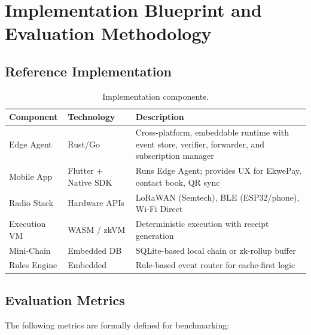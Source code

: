 \documentclass[11pt,a4paper]{article}
\begin{document}
\section{Implementation Blueprint and Evaluation Methodology}

\subsection{Reference Implementation}

\begin{table}[H]
\centering
\caption{Implementation components.}
\label{tab:impl}
\begin{tabular}{@{}llp{6.5cm}@{}}
\toprule
\textbf{Component} & \textbf{Technology} & \textbf{Description} \\
\midrule
Edge Agent & Rust/Go & Cross-platform, embeddable runtime with event store, verifier, forwarder, and subscription manager \\
Mobile App & Flutter + Native SDK & Runs Edge Agent; provides UX for EkwePay, contact book, QR sync \\
Radio Stack & Hardware APIs & LoRaWAN (Semtech), BLE (ESP32/phone), Wi-Fi Direct \\
Execution VM & WASM / zkVM & Deterministic execution with receipt generation~\cite{risczero} \\
Mini-Chain & Embedded DB & SQLite-based local chain or zk-rollup buffer \\
Rules Engine & Embedded & Rule-based event router for cache-first logic \\
\bottomrule
\end{tabular}
\end{table}

\subsection{Evaluation Metrics}

The following metrics are formally defined for benchmarking:
\end{document}
